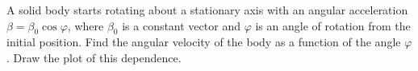 
\item A solid body starts rotating about a stationary axis with an angular acceleration \(\beta = \beta_0 \cos \varphi\), where \(\beta_0\) is a constant vector and \(\varphi\) is an angle of rotation from the initial position. Find the angular velocity of the body as a function of the angle \(\varphi\). Draw the plot of this dependence.
